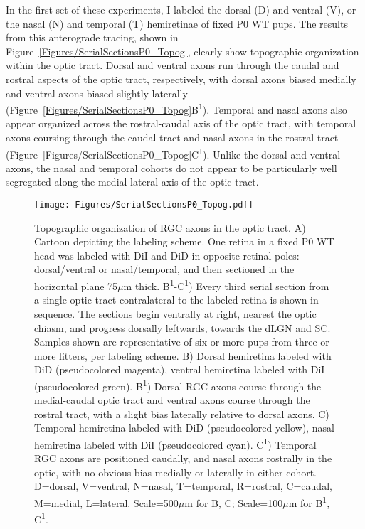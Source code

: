 In the first set of these experiments, I labeled the dorsal (D) and ventral (V), or the nasal (N) and temporal (T) hemiretinae of fixed P0 WT pups.
The results from this anterograde tracing, shown in Figure~\ref{Figures/SerialSectionsP0_Topog}, clearly show topographic organization within the optic tract.
Dorsal and ventral axons run through the caudal and rostral aspects of the optic tract, respectively, with dorsal axons biased medially and ventral axons biased slightly laterally (Figure~\ref{Figures/SerialSectionsP0_Topog}B\textsuperscript{1}).
Temporal and nasal axons also appear organized across the rostral-caudal axis of the optic tract, with temporal axons coursing through the caudal tract and nasal axons in the rostral tract (Figure~\ref{Figures/SerialSectionsP0_Topog}C\textsuperscript{1}).
Unlike the dorsal and ventral axons, the nasal and temporal cohorts do not appear to be particularly well segregated along the medial-lateral axis of the optic tract.
\begin{figure}[hbtp]
    \begin{center}
        \texttt{[image: Figures/SerialSectionsP0\_Topog.pdf]}
        \caption[Topographic organization of RGC axons in the optic tract.]
        {Topographic organization of RGC axons in the optic tract.
        A) Cartoon depicting the labeling scheme.
        One retina in a fixed P0 WT head was labeled with DiI and DiD in opposite retinal poles: dorsal/ventral or nasal/temporal, and then sectioned in the horizontal plane 75$\mu$m thick.
        B\textsuperscript{1}-C\textsuperscript{1}) Every third serial section from a single optic tract contralateral to the labeled retina is shown in sequence.
        The sections begin ventrally at right, nearest the optic chiasm, and progress dorsally leftwards, towards the dLGN and SC.
        Samples shown are representative of six or more pups from three or more litters, per labeling scheme. %
        B) Dorsal hemiretina labeled with DiD (pseudocolored magenta), ventral hemiretina labeled with DiI (pseudocolored green).
        B\textsuperscript{1}) Dorsal RGC axons course through the medial-caudal optic tract and ventral axons course through the rostral tract, with a slight bias laterally relative to dorsal axons.
        C) Temporal hemiretina labeled with DiD (pseudocolored yellow), nasal hemiretina labeled with DiI (pseudocolored cyan).
        C\textsuperscript{1}) Temporal RGC axons are positioned caudally, and nasal axons rostrally in the optic, with no obvious bias medially or laterally in either cohort.
        D=dorsal, V=ventral, N=nasal, T=temporal, R=rostral, C=caudal, M=medial, L=lateral. 
		Scale=500$\mu$m for B, C; Scale=100$\mu$m for B\textsuperscript{1}, C\textsuperscript{1}.}
        \label{Figures/SerialSectionsP0Topog}
    \end{center}
\end{figure}

